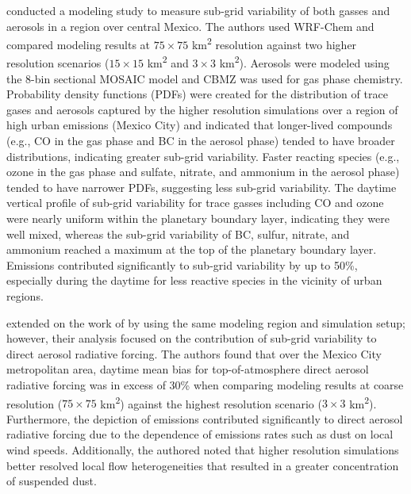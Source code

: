 \textcite{qian_investigation_2010} conducted a modeling study to measure sub-grid variability of both gasses and aerosols in a region over central Mexico. The authors used WRF-Chem and compared modeling results at $75\times75$ \si{km^2} resolution against two higher resolution scenarios ($15\times15$ \si{km^2} and $3\times3$ \si{km^2}). Aerosols were modeled using the 8-bin sectional MOSAIC model and CBMZ was used for gas phase chemistry. Probability density functions (PDFs) were created for the distribution of trace gases and aerosols captured by the higher resolution simulations over a region of high urban emissions (Mexico City) and indicated that longer-lived compounds (e.g., CO in the gas phase and BC in the aerosol phase) tended to have broader distributions, indicating greater sub-grid variability. Faster reacting species (e.g., ozone in the gas phase and sulfate, nitrate, and ammonium in the aerosol phase) tended to have narrower PDFs, suggesting less sub-grid variability. The daytime vertical profile of sub-grid variability for trace gasses including CO and ozone were nearly uniform within the planetary boundary layer, indicating they were well mixed, whereas the sub-grid variability of BC, sulfur, nitrate, and ammonium reached a maximum at the top of the planetary boundary layer. Emissions contributed significantly to sub-grid variability by up to 50\%, especially during the daytime for less reactive species in the vicinity of urban regions. 

\textcite{gustafson_jr_downscaling_2011} extended on the work of \textcite{qian_investigation_2010} by using the same modeling region and simulation setup; however, their analysis focused on the contribution of sub-grid variability to direct aerosol radiative forcing. The authors found that over the Mexico City metropolitan area, daytime mean bias for top-of-atmosphere direct aerosol radiative forcing was in excess of 30\% when comparing modeling results at coarse resolution ($75\times75$ \si{km^2}) against the highest resolution scenario ($3\times3$ \si{km^2}). Furthermore, the depiction of emissions contributed significantly to direct aerosol radiative forcing due to the dependence of emissions rates such as dust on local wind speeds. Additionally, the authored noted that higher resolution simulations better resolved local flow heterogeneities that resulted in a greater concentration of suspended dust. 


